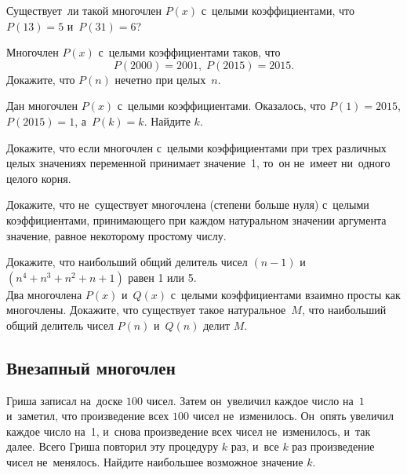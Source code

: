 \begin{problems}

\item
Существует~ли такой многочлен $P(x)$ с~целыми коэффициентами, что
$P(13) = 5$ и~$P(31) = 6$?

\item
Многочлен $P(x)$ с~целыми коэффициентами таков, что
\[
    P(2000) = 2001
,\;
    P(2015) = 2015
.\]
Докажите, что $P(n)$ нечетно при целых~$n$.

\item
Дан многочлен $P(x)$ с~целыми коэффициентами.
Оказалось, что $P(1) = 2015$,  $P(2015) = 1$, а~$P(k) = k$.
Найдите $k$.

\item
Докажите, что если многочлен с~целыми коэффициентами при трех различных целых
значениях переменной принимает значение~1, то~он не~имеет ни~одного целого
корня.

\item
Докажите, что не~существует многочлена (степени больше нуля) с~целыми
коэффициентами, принимающего при каждом натуральном значении аргумента
значение, равное некоторому простому числу.

\item
\subproblem
Докажите, что наибольший общий делитель чисел $(n - 1)$
и~$(n^4 + n^3 + n^2 + n + 1)$ равен 1 или 5.
\\
\subproblem
Два многочлена $P(x)$ и~$Q(x)$ с~целыми коэффициентами взаимно просты как
многочлены.
Докажите, что существует такое натуральное~$M$, что наибольший общий делитель
чисел $P(n)$ и~$Q(n)$ делит $M$.

\end{problems}

\subsection*{Внезапный многочлен}

\begin{problems}

\item
Гриша записал на~доске $100$ чисел.
Затем он~увеличил каждое число на~$1$ и~заметил, что произведение всех
$100$ чисел не~изменилось.
Он~опять увеличил каждое число на~1, и~снова произведение всех чисел
не~изменилось, и~так далее.
Всего Гриша повторил эту процедуру $k$ раз, и~все $k$ раз произведение чисел
не~менялось.
Найдите наибольшее возможное значение $k$.

\end{problems}


